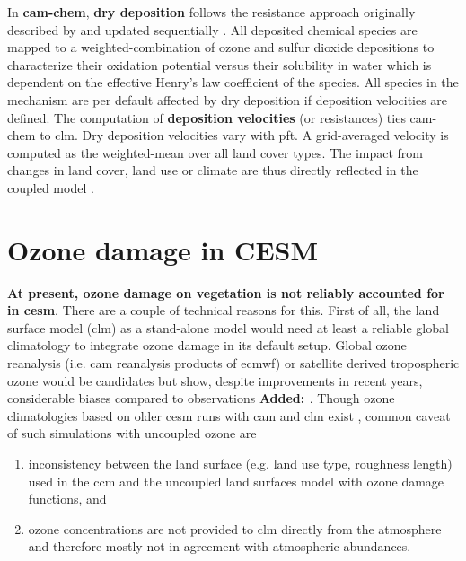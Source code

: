 In \textbf{\gls{cam}-chem}, \textbf{dry deposition} follows the resistance approach originally described by \textcites{AE:Wesely1989}{AE:Walcek1986} and updated sequentially \parencites{AE:Walmsley1996}{AE:Wesely2000}. All deposited chemical species are mapped to a weighted-combination of ozone and sulfur dioxide depositions to characterize their oxidation potential versus their solubility in water which is dependent on the effective Henry’s law coefficient of the species. All species in the mechanism are per default affected by dry deposition if deposition velocities are defined. The computation of \textbf{deposition velocities} (or resistances) ties \gls{cam}-chem to \gls{clm}. Dry deposition velocities vary with \gls{pft}. A grid-averaged velocity is computed as the weighted-mean over all land cover types. The impact from changes in land cover, land use or climate are thus directly reflected in the coupled model \parencite{GMD:Lamarque2012}. 

\section{Ozone damage in CESM}
\label{sec:ozone_damage}
\textbf{At present, ozone damage on vegetation is not reliably accounted for in \gls{cesm}}. There are a couple of technical reasons for this. First of all, the land surface model (\gls{clm}) as a stand-alone model would need at least a reliable global climatology to integrate ozone damage in its default setup. Global ozone reanalysis (i.e. \gls{cam} reanalysis products of \gls{ecmwf}) or satellite derived tropospheric ozone would be candidates but show, despite improvements in recent years, considerable biases compared to observations \textbf{\color{blue}Added: \parencites{GMD:Huijnen2020}{ACPD:Barten2020}}. Though ozone climatologies based on older \gls{cesm} runs with \gls{cam} and \gls{clm} exist \parencite{ACP:Lamarque2010}, common caveat of such simulations with uncoupled ozone are
\begin{enumerate}
\itemsep0pt
\item inconsistency between the land surface (e.g. land use type, roughness length) used in the \gls{ccm} and the uncoupled land surfaces model with ozone damage functions, and
\item ozone concentrations are not provided to \gls{clm} directly from the atmosphere and therefore mostly not in agreement with atmospheric abundances.
\end{enumerate}

